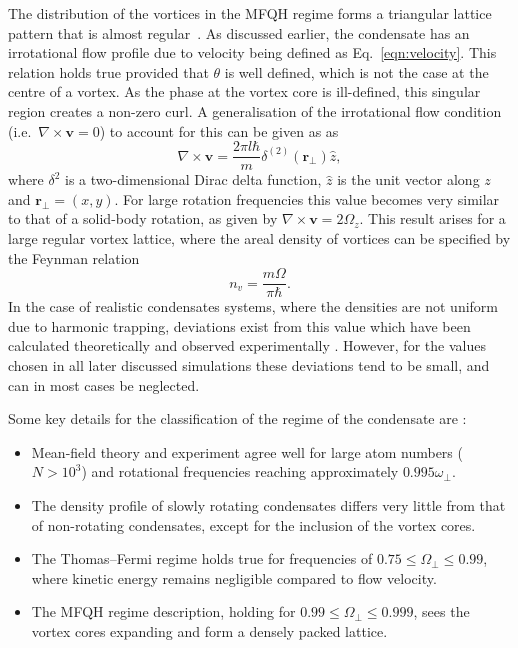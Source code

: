 The distribution of the vortices in the MFQH regime forms a triangular lattice pattern that is almost regular~\cite{Vtx:Schweikhard_prl_2004}. As discussed earlier, the condensate has an irrotational flow profile due to velocity being defined as Eq.~\eqref{eqn:velocity}. This relation holds true provided that $\theta$ is well defined, which is not the case at the centre of a vortex. As the phase at the vortex core is ill-defined, this singular region creates a non-zero curl. A generalisation of the irrotational flow condition (i.e.\ $\nabla\times \mathbf{v}=0$) to account for this can be given as as~\cite{BK:Pitaevskii_Stringari_2003,BK:Pethick_Smith_2008}
\begin{equation}
    \nabla\times \mathbf{v}=\frac{2\pi l\hbar}{m}\delta^{(2)}(\mathbf{r}_\perp) \hat{z},
\end{equation}
where $\delta^2$ is a two-dimensional Dirac delta function, $\hat{z}$ is the unit vector along $z$ and $\mathbf{r}_\perp=(x,y)$. For large rotation frequencies this value becomes very similar to that of a solid-body rotation, as given by $\nabla \times \mathbf{v}=2\Omega_z$. This result arises for a large regular vortex lattice, where the areal density of vortices can be specified by the Feynman relation~\cite{BK:Pitaevskii_Stringari_2003}
\begin{equation}\label{eqn:feynman}
n_{v} = \frac{m\Omega}{\pi\hbar}.
\end{equation}
In the case of realistic condensates systems, where the densities are not uniform due to harmonic trapping, deviations exist from this value which have been calculated theoretically \cite{Phys. Rev. Lett. 93, 190401 (2004), Vtx:Sheey_pra_2004_2,Vtx:Sheey_pra_2004, PRA 70, 033604 (2004) } and observed experimentally \cite{VTX:Coddington_pra_2004}. However, for the values chosen in all later discussed simulations these deviations tend to be small, and can in most cases be neglected.

Some key details for the classification of the regime of the condensate are \cite{BEC:Fetter_revmodphys_2009}:
\begin{itemize}
\item Mean-field theory and experiment agree well for large atom numbers ($N>10^3$) and rotational frequencies reaching approximately $0.995\omega_{\perp}$.
\item The density profile of slowly rotating condensates differs very little from that of non-rotating condensates, except for the inclusion of the vortex cores.
\item The Thomas--Fermi regime holds true for frequencies of $0.75 \leq \Omega_\perp \leq 0.99$, where kinetic energy remains negligible compared to flow velocity.
\item The MFQH regime description, holding for $0.99 \leq \Omega_\perp \leq 0.999$, sees the vortex cores expanding and form a densely packed lattice. %
\end{itemize}

